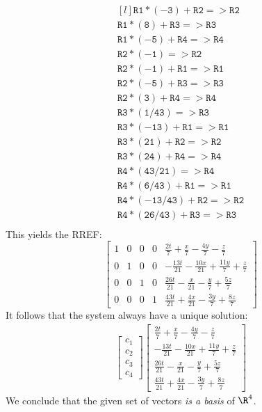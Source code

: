 \documentclass[12pt]{article}
\begin{document}
\[
\begin{matrix*}[l]
\mathtt{R1*(-3)+R2=>R2}\\
\mathtt{R1*(8)+R3=>R3}\\
\mathtt{R1*(-5)+R4=>R4}\\
\mathtt{R2*(-1)=>R2}\\
\mathtt{R2*(-1)+R1=>R1}\\
\mathtt{R2*(-5)+R3=>R3}\\
\mathtt{R2*(3)+R4=>R4}\\
\mathtt{R3*(1/43)=>R3}\\
\mathtt{R3*(-13)+R1=>R1}\\
\mathtt{R3*(21)+R2=>R2}\\
\mathtt{R3*(24)+R4=>R4}\\
\mathtt{R4*(43/21)=>R4}\\
\mathtt{R4*(6/43)+R1=>R1}\\
\mathtt{R4*(-13/43)+R2=>R2}\\
\mathtt{R4*(26/43)+R3=>R3}\\
\end{matrix*}
\]
This yields the RREF:
\[
\left[\begin{matrix}1 & 0 & 0 & 0 & \frac{2 t}{7} + \frac{x}{7} - \frac{4 y}{7} - \frac{z}{7}\\0 & 1 & 0 & 0 & - \frac{13 t}{21} - \frac{10 x}{21} + \frac{11 y}{7} + \frac{z}{7}\\0 & 0 & 1 & 0 & \frac{26 t}{21} - \frac{x}{21} - \frac{y}{7} + \frac{5 z}{7}\\0 & 0 & 0 & 1 & \frac{43 t}{21} + \frac{4 x}{21} - \frac{3 y}{7} + \frac{8 z}{7}\end{matrix}\right]
\]
It follows that the system always have a unique solution:
\begin{align*}
\begin{bmatrix}c_1\\c_2\\c_3\\c_4\end{bmatrix}
\left[\begin{matrix}\frac{2 t}{7} + \frac{x}{7} - \frac{4 y}{7} - \frac{z}{7}\\- \frac{13 t}{21} - \frac{10 x}{21} + \frac{11 y}{7} + \frac{z}{7}\\\frac{26 t}{21} - \frac{x}{21} - \frac{y}{7} + \frac{5 z}{7}\\\frac{43 t}{21} + \frac{4 x}{21} - \frac{3 y}{7} + \frac{8 z}{7}\end{matrix}\right]
\end{align*}
We conclude that the given set of vectors \emph{is a basis} of $\R^4$.
\proofend
\end{document}
